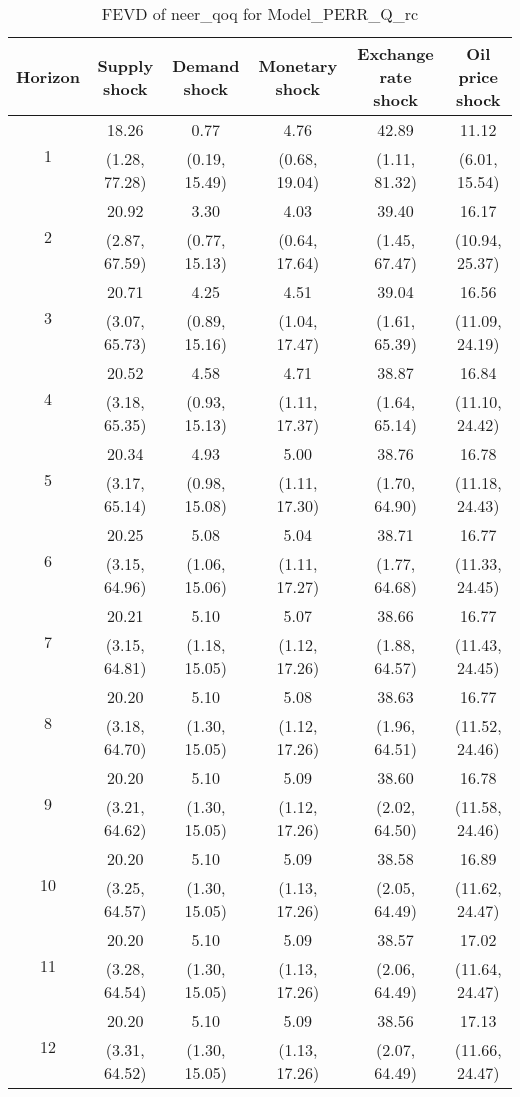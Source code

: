 \documentclass{article}
\begin{document}
\begin{table}
	\footnotesize
	\caption{FEVD of neer_qoq for Model_PERR_Q_rc}
	\begin{tabular}{cccccc}
		Horizon & Supply shock & Demand shock & Monetary shock & Exchange rate shock & Oil price shock\\ \hline
		\multirow{2}{*}{1} & 18.26 & 0.77 & 4.76 & 42.89 & 11.12\\
		 & (1.28, 77.28) & (0.19, 15.49) & (0.68, 19.04) & (1.11, 81.32) & (6.01, 15.54)\\
		\multirow{2}{*}{2} & 20.92 & 3.30 & 4.03 & 39.40 & 16.17\\
		 & (2.87, 67.59) & (0.77, 15.13) & (0.64, 17.64) & (1.45, 67.47) & (10.94, 25.37)\\
		\multirow{2}{*}{3} & 20.71 & 4.25 & 4.51 & 39.04 & 16.56\\
		 & (3.07, 65.73) & (0.89, 15.16) & (1.04, 17.47) & (1.61, 65.39) & (11.09, 24.19)\\
		\multirow{2}{*}{4} & 20.52 & 4.58 & 4.71 & 38.87 & 16.84\\
		 & (3.18, 65.35) & (0.93, 15.13) & (1.11, 17.37) & (1.64, 65.14) & (11.10, 24.42)\\
		\multirow{2}{*}{5} & 20.34 & 4.93 & 5.00 & 38.76 & 16.78\\
		 & (3.17, 65.14) & (0.98, 15.08) & (1.11, 17.30) & (1.70, 64.90) & (11.18, 24.43)\\
		\multirow{2}{*}{6} & 20.25 & 5.08 & 5.04 & 38.71 & 16.77\\
		 & (3.15, 64.96) & (1.06, 15.06) & (1.11, 17.27) & (1.77, 64.68) & (11.33, 24.45)\\
		\multirow{2}{*}{7} & 20.21 & 5.10 & 5.07 & 38.66 & 16.77\\
		 & (3.15, 64.81) & (1.18, 15.05) & (1.12, 17.26) & (1.88, 64.57) & (11.43, 24.45)\\
		\multirow{2}{*}{8} & 20.20 & 5.10 & 5.08 & 38.63 & 16.77\\
		 & (3.18, 64.70) & (1.30, 15.05) & (1.12, 17.26) & (1.96, 64.51) & (11.52, 24.46)\\
		\multirow{2}{*}{9} & 20.20 & 5.10 & 5.09 & 38.60 & 16.78\\
		 & (3.21, 64.62) & (1.30, 15.05) & (1.12, 17.26) & (2.02, 64.50) & (11.58, 24.46)\\
		\multirow{2}{*}{10} & 20.20 & 5.10 & 5.09 & 38.58 & 16.89\\
		 & (3.25, 64.57) & (1.30, 15.05) & (1.13, 17.26) & (2.05, 64.49) & (11.62, 24.47)\\
		\multirow{2}{*}{11} & 20.20 & 5.10 & 5.09 & 38.57 & 17.02\\
		 & (3.28, 64.54) & (1.30, 15.05) & (1.13, 17.26) & (2.06, 64.49) & (11.64, 24.47)\\
		\multirow{2}{*}{12} & 20.20 & 5.10 & 5.09 & 38.56 & 17.13\\
		 & (3.31, 64.52) & (1.30, 15.05) & (1.13, 17.26) & (2.07, 64.49) & (11.66, 24.47)\\
	\end{tabular}
\label{tab:fevd-Model_PERR_Q_rc-neer_qoq}
\end{table}
\end{document}
